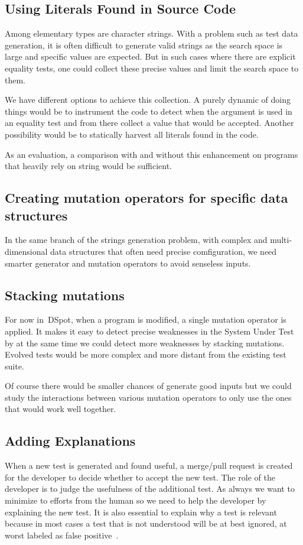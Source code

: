 \documentclass[11pt]{sdm}
\newcommand{\dspot}{DSpot\xspace}
\begin{document}
\subsection{Using Literals Found in Source Code}
\label{mutation}
Among elementary types are character strings.
With a problem such as test data generation, it is often difficult to generate valid strings as the search space is large and specific values are expected.
But in such cases where there are explicit equality tests, one could collect these precise values and limit the search space to them.

We have different options to achieve this collection.
A purely dynamic of doing things would be to instrument the code to detect when the argument is used in an equality test and from there collect a value that would be accepted.
Another possibility would be to statically harvest all literals found in the code.

As an evaluation, a comparison with and without this enhancement on programs that heavily rely on string would be sufficient.

\subsection{Creating mutation operators for specific data structures}
\label{create_operators}
In the same branch of the strings generation problem, with complex and multi-dimensional data structures that often need precise comfiguration, we need smarter generator and mutation operators to avoid senseless inputs.

\subsection{Stacking mutations}
\label{stacking}
For now in~\dspot{}, when a program is modified, a single mutation operator is applied.
It makes it easy to detect precise weaknesses in the System Under Test by at the same time we could detect more weaknesses by stacking mutations.
Evolved tests would be more complex and more distant from the existing test suite.

Of course there would be smaller chances of generate good inputs but we could study the interactions between various mutation operators to only use the ones that would work well together.

\subsection{Adding Explanations}
\label{explanation}
When a new test is generated and found useful, a merge/pull request is created for the developer to decide whether to accept the new test.
The role of the developer is to judge the usefulness of the additional test.
As always we want to minimize to efforts from the human so we need to help the developer by explaining the new test.
It is also essential to explain why a test is relevant because in most cases a test that is not understood will be at best ignored, at worst labeled as false positive~\cite{bessey2010few}.
\end{document}
